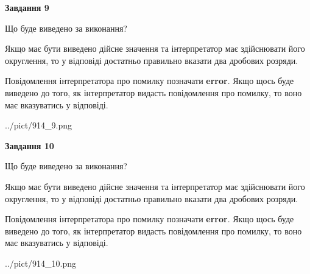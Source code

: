 \documentclass[12pt, ukrainian]{article}
\begin{document}
{\begin {Large}
{\begin {center}\textbf{Завдання 9}\end {center}}\par
Що буде виведено за виконання? \par

Якщо має бути виведено дійсне значення та інтерпретатор має здійснювати його округлення, 
то у відповіді достатньо правильно вказати два дробових розряди.

Повідомлення інтерпретатора про помилку позначати \textbf{error}.
Якщо щось буде виведено до того, як інтерпретатор видасть повідомлення про помилку, 
то воно має вказуватись у відповіді. \par

\begin{center}
	{../pict/914_9.png}
\end{center}
\newpage

{\begin {center}\textbf{Завдання 10}\end {center}}\par
Що буде виведено за виконання? \par

Якщо має бути виведено дійсне значення та інтерпретатор має здійснювати його округлення, 
то у відповіді достатньо правильно вказати два дробових розряди.

Повідомлення інтерпретатора про помилку позначати \textbf{error}.
Якщо щось буде виведено до того, як інтерпретатор видасть повідомлення про помилку, 
то воно має вказуватись у відповіді. \par

\begin{center}
	{../pict/914_10.png}
\end{center}
\newpage

\end {Large}}
\end{document}
